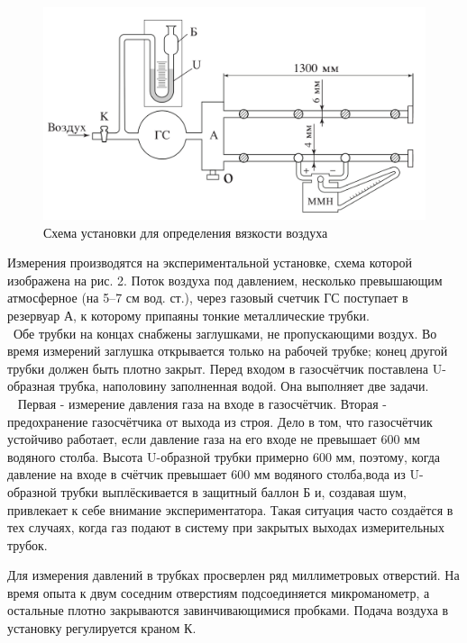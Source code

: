 \documentclass[a4paper,12pt]{article}
\theoremstyle{plain} %
\theoremstyle{definition} %
\theoremstyle{remark} %
\begin{document}
\begin{figure}\label{pic:Pic2}
	\includegraphics[width=\linewidth]{pic2.png}
	\caption{Схема установки для определения вязкости воздуха}

\end{figure}
Измерения производятся на экспериментальной установке, схема которой изображена на рис. 2. Поток воздуха под давлением, несколько превышающим атмосферное (на 5–7 см вод. ст.), через газовый счетчик ГС поступает в резервуар А, к которому припаяны тонкие металлические трубки.
\\[1ex]\
\indent Обе трубки на концах снабжены заглушками, не пропускающими воздух. Во время измерений заглушка открывается только на рабочей трубке; конец другой трубки должен быть плотно закрыт. Перед входом в газосчётчик поставлена U-образная трубка, наполовину заполненная водой. Она выполняет две задачи.
\\[1ex]\
\indent 
Первая - измерение давления газа на входе в газосчётчик. Вторая - предохранение газосчётчика от выхода из строя. Дело в том, что газосчётчик устойчиво работает, если давление газа на его входе не превышает 600 мм водяного столба. Высота U-образной трубки примерно 600 мм, поэтому, когда давление на входе в счётчик превышает 600 мм водяного столба,вода из U-образной трубки выплёскивается в защитный баллон Б и, создавая шум, привлекает к себе внимание экспериментатора. Такая ситуация часто создаётся в тех случаях, когда газ подают в систему при закрытых выходах измерительных трубок.

Для измерения давлений в трубках просверлен ряд миллиметровых отверстий. На время опыта к двум соседним отверстиям подсоединяется микроманометр, а остальные плотно закрываются завинчивающимися пробками. Подача воздуха в установку регулируется краном К.
\end{document}

